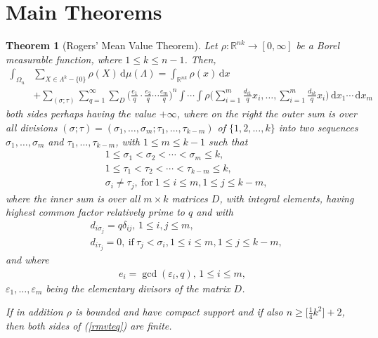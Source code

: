 \documentclass[11pt]{article}
\newtheorem{theorem}{Theorem}[section]
\theoremstyle{definition}
\theoremstyle{proof}
\begin{document}
\section{Main Theorems}
\begin{theorem}[Rogers' Mean Value Theorem]\label{rmvt}
    Let $\rho : \mathbb{R}^{nk} \to [0, \infty]$ be a Borel measurable function, where $1 \leq k \leq n-1$.
    Then,
    \begin{equation}\label{rmvteq}
        \begin{split}
            \int_{{\Omega}_n} & \sum_{X \in \Lambda ^k - \{0\}} \rho (X) \, \mathrm{d} \mu (\Lambda ) = \int_{\mathbb{R}^{nk}} \rho (x) \,  \mathrm{d} x \\
            & + \sum_{(\sigma ; \tau )} \sum_{q=1}^{\infty}\sum_{D} {\bigg(\frac{e_1}{q} \cdot \frac{e_2}{q} \cdots \frac{e_m}{q} \bigg)}^n \int \cdots \int \rho \bigg(\sum_{i=1}^{m}\frac{d_{i1}}{q} x_i, \ldots , \sum_{i=1}^{m}\frac{d_{ik}}{q} x_i \bigg) \, \mathrm{d} x_1 \cdots \, \mathrm{d} x_m
        \end{split}
    \end{equation}
    both sides perhaps having the value $+\infty$, where on the right the outer sum is over all divisions $(\sigma ; \tau ) = (\sigma _1, \ldots, \sigma _m; \tau _1, \ldots, \tau _{k-m})$ of $\{1, 2, \ldots , k\}$ into two sequences $\sigma _1, \ldots , \sigma _m$ and $\tau _1, \ldots , \tau _{k-m}$, with $1\leq m \leq k-1$ such that
    \begin{equation}\label{sigmatau}
        \begin{split}
            & 1 \leq \sigma _1 < \sigma _2 < \cdots < \sigma _m \leq  k, \\
            & 1 \leq  \tau _1 < \tau _2 < \cdots < \tau _{k-m} \leq  k, \\
            & \sigma _i \neq \tau _j, \ \text{for} \  1\leq  i \leq  m, 1\leq  j\leq  k-m,
        \end{split}
    \end{equation}
    where the inner sum is over all $m \times k$ matrices $D$, with integral elements, having highest common factor relatively prime to $q$ and with
    \begin{equation}\label{D}
        \begin{split}
            & d_{i \sigma _j} = q \delta _{ij}, \,  1 \leq  i, j \leq  m,\\
            & d_{i \tau _j} = 0, \ \text{if} \ \tau _j < \sigma _i, 1 \leq  i \leq m , 1\leq  j \leq  k-m,
        \end{split}
    \end{equation}
    and where
    \begin{align*}
        e_i = \gcd (\varepsilon _i, q), \, 1 \leq  i \leq  m,
    \end{align*}
    $\varepsilon _1, \ldots , \varepsilon _m$ being the elementary divisors of the matrix $D$.

    If in addition $\rho$ is bounded and have compact support and if also $n \geq  \big[\frac{1}{4} k ^2\big] + 2$, then both sides of (\ref{rmvteq}) are finite.
\end{theorem}
\end{document}
